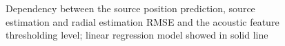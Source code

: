 \documentclass[applsci,article,submit,moreauthors,pdftex]{Definitions/mdpi}
\begin{document}
\begin{figure}[h!]
	\centering
	\caption{Dependency between the source position prediction, source \doa{} estimation  and radial estimation RMSE and the 
		acoustic feature thresholding level; 
		linear regression model showed in solid line}
	\label{fig:rmsethrmeanlvl}
\end{figure}
\end{document}
